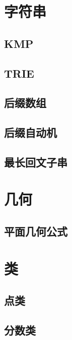 \chapter{字符串}
\section{KMP}
\raggedbottom
\hrulefill
\section{TRIE}
\raggedbottom
\hrulefill
\section{后缀数组}
\raggedbottom
\hrulefill
\section{后缀自动机}
\raggedbottom
\hrulefill
\section{最长回文子串}
\raggedbottom
\hrulefill

\chapter{几何}
\section{平面几何公式}
\raggedbottom
\hrulefill

\chapter{类}
\section{点类}
\raggedbottom
\hrulefill
\section{分数类}
\raggedbottom
\hrulefill
